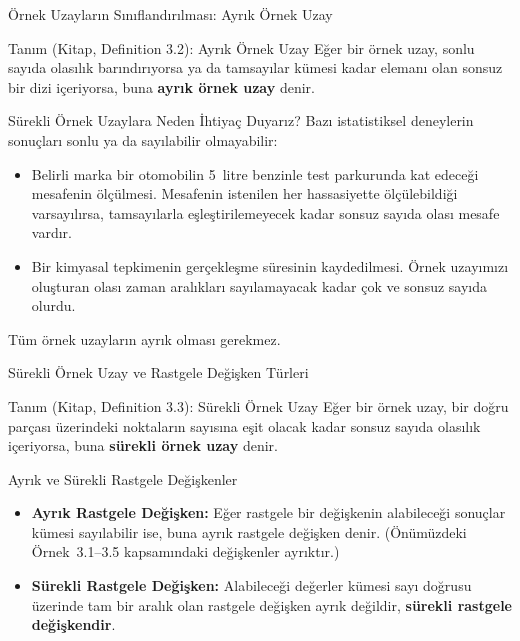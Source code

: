﻿\documentclass[light]{lutbeamer}
\begin{document}
\begin{frame}{Örnek Uzayların Sınıflandırılması: Ayrık Örnek Uzay}
    \begin{block}{Tanım (Kitap, Definition 3.2): Ayrık Örnek Uzay}
        Eğer bir örnek uzay, sonlu sayıda olasılık barındırıyorsa ya da tamsayılar kümesi kadar elemanı olan sonsuz bir dizi içeriyorsa, buna \textbf{ayrık örnek uzay} denir.
    \end{block}

    \begin{exampleblock}{Sürekli Örnek Uzaylara Neden İhtiyaç Duyarız?}
        Bazı istatistiksel deneylerin sonuçları sonlu ya da sayılabilir olmayabilir:
        \begin{itemize}
            \item Belirli marka bir otomobilin 5~litre benzinle test parkurunda kat edeceği mesafenin ölçülmesi. Mesafenin istenilen her hassasiyette ölçülebildiği varsayılırsa, tamsayılarla eşleştirilemeyecek kadar sonsuz sayıda olası mesafe vardır.
            \item Bir kimyasal tepkimenin gerçekleşme süresinin kaydedilmesi. Örnek uzayımızı oluşturan olası zaman aralıkları sayılamayacak kadar çok ve sonsuz sayıda olurdu.
        \end{itemize}
        Tüm örnek uzayların ayrık olması gerekmez.
    \end{exampleblock}
\end{frame}

\begin{frame}{Sürekli Örnek Uzay ve Rastgele Değişken Türleri}
    \begin{block}{Tanım (Kitap, Definition 3.3): Sürekli Örnek Uzay}
        Eğer bir örnek uzay, bir doğru parçası üzerindeki noktaların sayısına eşit olacak kadar sonsuz sayıda olasılık içeriyorsa, buna \textbf{sürekli örnek uzay} denir.
    \end{block}

    \begin{block}{Ayrık ve Sürekli Rastgele Değişkenler}
        \begin{itemize}
            \item \textbf{Ayrık Rastgele Değişken:} Eğer rastgele bir değişkenin alabileceği sonuçlar kümesi sayılabilir ise, buna ayrık rastgele değişken denir. (Önümüzdeki Örnek~3.1--3.5 kapsamındaki değişkenler ayrıktır.)
            \item \textbf{Sürekli Rastgele Değişken:} Alabileceği değerler kümesi sayı doğrusu üzerinde tam bir aralık olan rastgele değişken ayrık değildir, \textbf{sürekli rastgele değişkendir}.
        \end{itemize}
    \end{block}
\end{frame}
\end{document}
